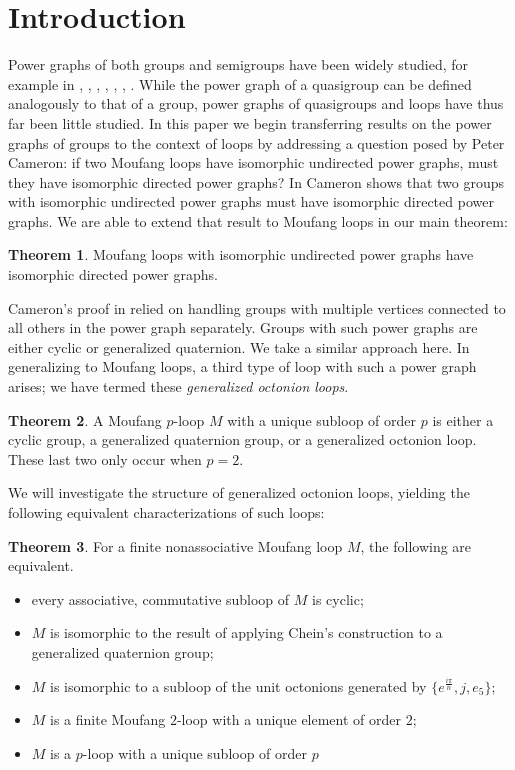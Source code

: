 \documentclass[12pt, twoside, openright]{report}
\theoremstyle{definition}
\newtheorem{thm}{Theorem}[chapter]
\begin{document}
\section{Introduction}

Power graphs of both groups and semigroups have been widely studied, for example in \cite{EPG}, \cite{PG},
  \cite{PGII}, \cite{Tor}, \cite{Feng}, \cite{Mog}, \cite{Panda}. While the power graph of a quasigroup
  can be defined analogously to that of a group, power graphs of quasigroups and loops have thus far been
  little studied. In this paper we begin transferring results on the power graphs of groups to the context
  of loops by addressing a question posed by Peter Cameron: if two Moufang loops have isomorphic undirected
  power graphs, must they have isomorphic directed power graphs? In \cite{PGII} Cameron shows that two groups
  with isomorphic undirected power graphs must have isomorphic directed power graphs. We are able to extend
  that result to Moufang loops in our main theorem:

\begin{thm}\label{mainThm}
  Moufang loops with isomorphic undirected power graphs have isomorphic directed power graphs.
\end{thm}

Cameron's proof in \cite{PGII} relied on handling groups with multiple vertices connected to all others in
  the power graph separately. Groups with such power graphs are either cyclic or generalized quaternion. We
  take a similar approach here. In generalizing to Moufang loops, a third type of loop with such a power graph
  arises; we have termed these \textit{generalized octonion loops}. 

\begin{thm}\label{moufangDesc2}
  A Moufang $p$-loop $M$ with a unique subloop of order $p$ is either a cyclic group, a generalized quaternion
    group, or a generalized octonion loop. These last two only occur when $p = 2$.
\end{thm}

We will investigate the structure of generalized octonion loops, yielding the following equivalent
  characterizations of such loops:

\begin{thm}\label{genOct}
  For a finite nonassociative Moufang loop $M$, the following are equivalent.
  \begin{itemize}
    \item every associative, commutative subloop of $M$ is cyclic;
    \item $M$ is isomorphic to the result of applying Chein's construction to a generalized quaternion group;
    \item $M$ is isomorphic to a subloop of the unit octonions generated by $\{e^{\frac{i\pi}{n}}, j, e_5\}$;
    \item $M$ is a finite Moufang $2$-loop with a unique element of order $2$;
    \item $M$ is a $p$-loop with a unique subloop of order $p$
  \end{itemize}
\end{thm}
\end{document}
